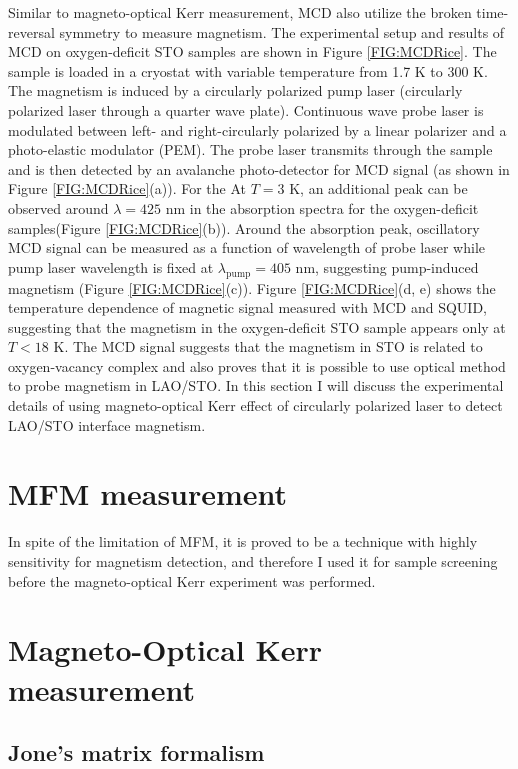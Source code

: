 \documentclass[pdflatex, sectionletters, 12pt]{pittetd}    %
\begin{document}
Similar to magneto-optical Kerr measurement, MCD also utilize the broken time-reversal symmetry to measure magnetism. The experimental setup and results of MCD on oxygen-deficit STO samples are shown in Figure \ref{FIG:MCDRice}. The sample is loaded in a cryostat with variable temperature from 1.7 K to 300 K. The magnetism is induced by a circularly polarized pump laser (circularly polarized laser through a quarter wave plate). Continuous wave probe laser is modulated between left- and right-circularly polarized by a linear polarizer and a photo-elastic modulator (PEM). The probe laser transmits through the sample and is then detected by an avalanche photo-detector for MCD signal (as shown in Figure \ref{FIG:MCDRice}(a)). For the At $T = 3$ K, an additional peak can be observed around $\lambda = 425$ nm in the absorption spectra for the oxygen-deficit samples(Figure \ref{FIG:MCDRice}(b)). Around the absorption peak, oscillatory MCD signal can be measured as a function of wavelength of probe laser while pump laser wavelength is fixed at $\lambda_{\mathrm{pump}} = 405$ nm, suggesting pump-induced magnetism (Figure \ref{FIG:MCDRice}(c)). Figure \ref{FIG:MCDRice}(d, e) shows the temperature dependence of magnetic signal measured with MCD and SQUID, suggesting that the magnetism in the oxygen-deficit STO sample appears only at $T < 18$ K. The MCD signal suggests that the magnetism in STO is related to oxygen-vacancy complex and also proves that it is possible to use optical method to probe magnetism in LAO/STO. In this section I will discuss the experimental details of using magneto-optical Kerr effect of circularly polarized laser to detect LAO/STO interface magnetism.

\section{MFM measurement}

In spite of the limitation of MFM, it is proved to be a technique with highly sensitivity\cite{bi2014room} for magnetism detection, and therefore I used it for sample screening before the magneto-optical Kerr experiment was performed. 

\section{Magneto-Optical Kerr measurement}

\subsection{Jone's matrix formalism}
\end{document}
